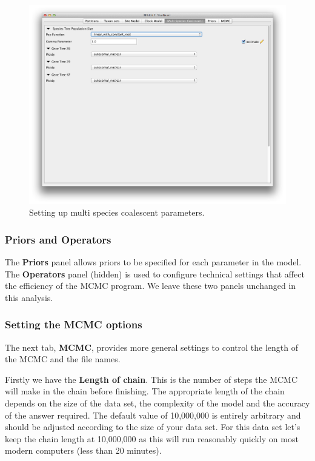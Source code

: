 \documentclass{article}
\begin{document}
\begin{figure}
\begin{center}

\includegraphics[scale=0.4,clip=true,trim=0 150 0 0]{figures/BEAUti_MSP}

\end{center}
\caption{\label{fig.MSP} Setting up multi species coalescent parameters.}
\end{figure}


\subsubsection*{Priors and Operators}

The {\bf Priors} panel allows priors to be specified for each parameter in the model. 
The {\bf Operators} panel (hidden) is used to configure technical settings that affect the efficiency of the MCMC program. 
We leave these two panels unchanged in this analysis.

\subsubsection*{Setting the MCMC options }

The next tab, {\bf MCMC}, provides more general
settings to control the length of the MCMC and the file names. 

Firstly we have the \textbf{Length of chain}. This is the number of
steps the MCMC will make in the chain before finishing. The appropriate length of the chain depends on the size of the data set, the complexity of the
model and the accuracy of the answer required. The default value of 10,000,000
is entirely arbitrary and should be adjusted according to the size
of your data set. For this data set let's keep the chain
length at 10,000,000 as this will run reasonably quickly on most modern
computers (less than 20 minutes).
\end{document}
